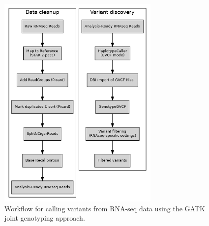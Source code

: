 \begin{figure}
	\begin{center}
		
		\includegraphics[width=0.7\textwidth]{misc/workflow.png}
		\caption[caption] {Workflow for calling variants from RNA-seq data using the GATK joint genotyping approach.}
		
	\end{center}
\end{figure}
